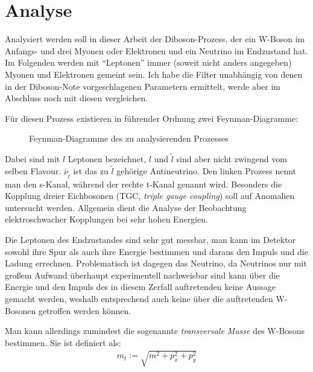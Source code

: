 \section{Analyse}
\label{cha:analyse}
Analysiert werden soll in dieser Arbeit der Diboson-Prozess, der ein W-Boson im
Anfangs- und drei Myonen oder Elektronen und ein Neutrino im Endzustand hat. Im
Folgenden werden mit "`Leptonen"' immer (soweit nicht anders angegeben) Myonen
und Elektronen gemeint sein. Ich habe die Filter unabhängig von denen in der
Diboson-Note vorgeschlagenen Parametern\cite{diboson-ana} ermittelt, werde aber
im Abschluss noch mit diesen vergleichen.

Für diesen Prozess existieren in führender Ordnung zwei Feynman-Diagramme:
\begin{figure}[h!]
  \begin{minipage}{0.49\textwidth}
    \centering
    
  \end{minipage}
  \begin{minipage}{0.49\textwidth}
    \centering
    
  \end{minipage}
  \caption{Feynman-Diagramme des zu analysierenden Prozesses}
  \label{fig:feynman}
\end{figure}
Dabei sind mit $l$ Leptonen bezeichnet, $l$ und $\tilde l$ sind aber nicht
zwingend vom selben Flavour. $\bar \nu_{\tilde l}$ ist das zu $\tilde l$
gehörige Antineutrino. Den linken Prozess nennt man den s-Kanal, während der
rechte t-Kanal genannt wird. Besonders die Kopplung dreier Eichbosonen
(TGC, \emph{triple gauge coupling}) soll auf Anomalien untersucht werden.
Allgemein dient die Analyse der Beobachtung elektroschwacher Kopplungen bei sehr
hohen Energien.

Die Leptonen des Endzustandes sind sehr gut messbar, man kann im Detektor sowohl
ihre Spur als auch ihre Energie bestimmen und daraus den Impuls und die Ladung
errechnen.  Problematisch ist dagegen das Neutrino, da Neutrinos nur mit großem
Aufwand überhaupt experimentell nachweisbar sind\cite{needed} kann über die
Energie und den Impuls des in diesem Zerfall auftretenden keine Aussage gemacht
werden, weshalb entsprechend auch keine über die auftretenden W-Bosonen
getroffen werden können.

\label{cha:met}
Man kann allerdings zumindest die sogenannte \emph{transversale Masse} des
W-Bosons bestimmen. Sie ist definiert als:
\begin{align}
  m_t := \sqrt{m^2 + p_x^2 + p_y^2}
  \label{def:trans}
\end{align}

